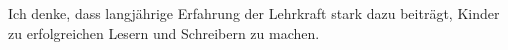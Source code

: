 Ich denke, dass langjährige Erfahrung der Lehrkraft stark dazu beiträgt, Kinder zu erfolgreichen Lesern und Schreibern zu machen.